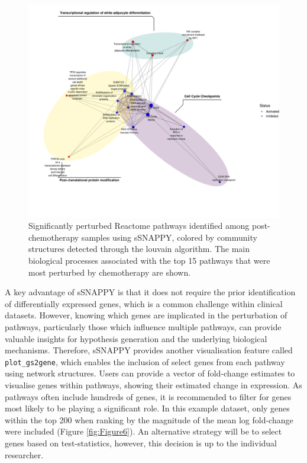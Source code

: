 \documentclass[9pt,a4paper,]{extarticle}
\begin{document}
\begin{figure}[hp]

{\centering \includegraphics[width=1\linewidth]{sSNAPPY_paper_files/figure-latex/Figure5-1} 

}

\caption{Significantly perturbed Reactome pathways identified among post-chemotherapy samples using sSNAPPY, colored by community structures detected through the louvain algorithm. The main biological processes associated with the top 15 pathways that were most perturbed by chemotherapy are shown.}\label{fig:Figure5}
\end{figure}

A key advantage of sSNAPPY is that it does not require the prior identification of differentially expressed genes, which is a common challenge within clinical datasets.
However, knowing which genes are implicated in the perturbation of pathways, particularly those which influence multiple pathways, can provide valuable insights for hypothesis generation and the underlying biological mechanisms.
Therefore, sSNAPPY provides another visualisation feature called \texttt{plot\_gs2gene}, which enables the inclusion of select genes from each pathway using network structures.
Users can provide a vector of fold-change estimates to visualise genes within pathways, showing their estimated change in expression.
As pathways often include hundreds of genes, it is recommended to filter for genes most likely to be playing a significant role.
In this example dataset, only genes within the top 200 when ranking by the magnitude of the mean log fold-change were included (Figure \ref{fig:Figure6}).
An alternative strategy will be to select genes based on test-statistics, however, this decision is up to the individual researcher.
\end{document}
